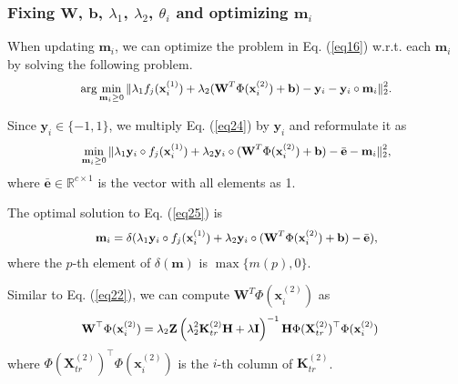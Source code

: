 \documentclass[10pt,journal,compsoc]{IEEEtran}
\begin{document}
\subsubsection{Fixing $\mathbf{W}$, $\mathbf{b}$, $\lambda_1$, $\lambda_2$, $\theta_i$ and optimizing $\mathbf{m}_i$}

When updating $\mathbf{m}_i$, we can optimize the problem in Eq. (\ref{eq16}) w.r.t. each $\mathbf{m}_i$ by solving the following problem.
\begin{equation}
\label{eq24}
\small{
\begin{split}
\arg \min_{\mathbf{m}_i \geq 0} \| \lambda_1 f_j(\mathbf{x}_i^{(1)})+\lambda_2 (\mathbf{W}^T \Phi(\mathbf{x}_i^{(2)})+\mathbf{b}) - \mathbf{y}_i-\mathbf{y}_i \circ \mathbf{m}_i\|_2^2.
\end{split}}
\end{equation}

Since $\mathbf{y}_i \in \{-1,1\}$, we multiply Eq. (\ref{eq24}) by $\mathbf{y}_i$ and reformulate it as
\begin{equation}
\label{eq25}
\small{
\begin{split}
\min_{\mathbf{m}_i \geq 0} \| \lambda_1 \mathbf{y}_i\circ f_j(\mathbf{x}_i^{(1)})+ \lambda_2 \mathbf{y}_i\circ (\mathbf{W}^T \Phi(\mathbf{x}_i^{(2)})+\mathbf{b}) - \bar{\mathbf{e}}- \mathbf{m}_i\|_2^2,
\end{split}}
\end{equation}
where $\bar{\mathbf{e}} \in \mathbb{R}^{c\times 1}$ is the vector with all elements as 1.

The optimal solution to Eq. (\ref{eq25}) is
\begin{equation}
\label{eq26}
\small{
\begin{split}
\mathbf{m}_i= \delta(\lambda_1 \mathbf{y}_i\circ f_j(\mathbf{x}_i^{(1)})+ \lambda_2 \mathbf{y}_i\circ (\mathbf{W}^T \Phi(\mathbf{x}_i^{(2)})+\mathbf{b}) - \bar{\mathbf{e}} ),
\end{split}}
\end{equation}
where the $p$-th element of $\delta(\mathbf{m})$ is $\max\{m(p),0\}$.

Similar to Eq. (\ref{eq22}), we can compute $\mathbf{W}^T \Phi(\mathbf{x}_i^{(2)})$ as
\begin{equation}
\label{eq27}
\small{
\begin{split}
& \mathbf{W}^\top \Phi(\mathbf{x}_i^{(2)}) =
\lambda_2 \mathbf{Z} \left( \lambda_2^2 \mathbf{K}_{tr}^{(2)} \mathbf{H} +\lambda \mathbf{I} \right)^{-1} \mathbf{H} \Phi(\mathbf{X}_{tr}^{(2)})^\top \Phi(\mathbf{x}_i^{(2)})
\end{split}}
\end{equation}
where $\Phi(\mathbf{X}_{tr}^{(2)})^\top \Phi(\mathbf{x}_i^{(2)})$ is the $i$-th column of $\mathbf{K}_{tr}^{(2)}$.
\end{document}
